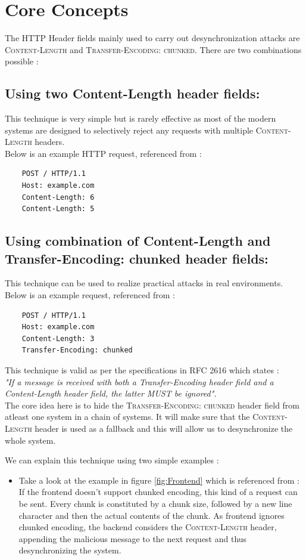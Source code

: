 \chapter{Core Concepts}
The HTTP Header fields mainly used to carry out desynchronization attacks are \textsc{Content-Length} and \textsc{Transfer-Encoding: chunked}. There are two combinations possible : 
\section{Using two Content-Length header fields:}
	This technique is very simple but is rarely effective as most of the modern systems are designed to selectively reject any requests with multiple \textsc{Content-Length} headers.\\
	Below is an example HTTP request, referenced from \cite{b6}:
	\begin{verbatim}
	POST / HTTP/1.1
	Host: example.com
	Content-Length: 6
	Content-Length: 5
	\end{verbatim}
\section{Using combination of Content-Length and Transfer-Encoding: chunked header fields:}This technique can be used to realize practical attacks in real environments. 
	Below is an example request, referenced from \cite{b6}:
	\begin{verbatim}
	POST / HTTP/1.1
	Host: example.com
	Content-Length: 3
	Transfer-Encoding: chunked
	\end{verbatim}
	This technique is valid as per the specifications in RFC 2616\cite{b10} which states : \\
	\textit{"If a message is received with both a Transfer-Encoding header field and a Content-Length header field, the latter MUST be ignored".}\\
	The core idea here is to hide the \textsc{Transfer-Encoding: chunked} header field from atleast one system in a chain of systems. It will make sure that the \textsc{Content-Length} header is used as a fallback and this will allow us to desynchronize the whole system.

We can explain this technique using two simple examples : 
\begin{itemize}
	\item Take a look at the example in figure \ref{fig:Frontend} which is referenced from \cite{b6}:
	If the frontend doesn't support chunked encoding, this kind of a request can be sent. Every chunk is constituted by a chunk size, followed by a new line character and then the actual contents of the chunk. As frontend ignores chunked encoding, the backend considers the \textsc{Content-Length} header, appending the malicious message to the next request and thus desynchronizing the system.
\end{itemize}


